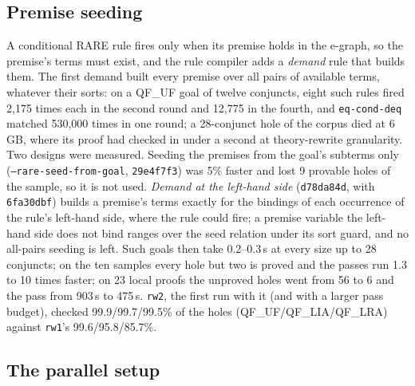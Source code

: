 \documentclass[11pt,a4paper]{article}
\newcommand{\UF}{QF\_UF}
\newcommand{\LIA}{QF\_LIA}
\newcommand{\LRA}{QF\_LRA}
\newcommand{\code}[1]{\texttt{#1}}
\begin{document}
\subsection{Premise seeding}\label{sec:seeding}

A conditional RARE rule fires only when its premise holds in the e-graph,
so the premise's terms must exist, and the rule compiler adds a
\emph{demand} rule that builds them. The first demand built every premise
over all pairs of available terms, whatever their sorts: on a \UF{} goal of
twelve conjuncts, eight such rules fired 2,175 times each in the second round
and 12,775 in the fourth, and \code{eq-cond-deq} matched 530,000 times in
one round; a 28-conjunct hole of the corpus died at 6\,GB, where its proof
had checked in under a second at theory-rewrite granularity. Two designs were measured. Seeding the premises
from the goal's subterms only (\code{--rare-seed-from-goal},
\code{29e4f7f3}) was 5\% faster and lost 9 provable holes of the sample, so
it is not used. \emph{Demand at the left-hand side} (\code{d78da84d}, with
\code{6fa30dbf}) builds a premise's terms exactly for the bindings of each
occurrence of the rule's left-hand side, where the rule could fire; a
premise variable the left-hand side does not bind ranges over the seed
relation under its sort guard, and no all-pairs seeding is left. Such
goals then take 0.2--0.3\,s at every size up to 28 conjuncts; on the ten
samples every hole but two is proved and the passes run 1.3 to 10 times
faster; on 23 local proofs the unproved holes went from 56 to 6 and the pass
from 903\,s to 475\,s. \code{rw2}, the first run with it (and with a
larger pass budget), checked 99.9/99.7/99.5\% of the holes
(\UF{}/\LIA{}/\LRA{}) against \code{rw1}'s 99.6/95.8/85.7\%.

\subsection{The parallel setup}\label{sec:parallel}
\end{document}
